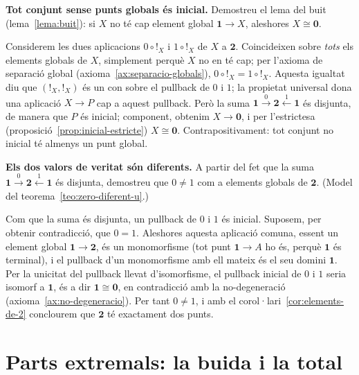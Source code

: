 \begin{exercici}
\textbf{Tot conjunt sense punts globals és inicial.} Demostreu el lema del buit (lema~\ref{lema:buit}): si \(X\) no té cap element global \(\mathbf1\to X\), aleshores \(X\cong\mathbf0\).
\end{exercici}
\begin{solucio}
Considerem les dues aplicacions \(0\circ{!}_X\) i \(1\circ{!}_X\) de \(X\) a \(\mathbf2\). Coincideixen sobre \emph{tots} els elements globals de \(X\), simplement perquè \(X\) no en té cap; per l'axioma de separació global (axioma~\ref{ax:separacio-globals}), \(0\circ{!}_X=1\circ{!}_X\). Aquesta igualtat diu que \(({!}_X,{!}_X)\) és un con sobre el pullback de \(0\) i \(1\); la propietat universal dona una aplicació \(X\to P\) cap a aquest pullback. Però la suma \(\mathbf1\xrightarrow{0}\mathbf2\xleftarrow{1}\mathbf1\) és disjunta, de manera que \(P\) és inicial; component, obtenim \(X\to\mathbf0\), i per l'estrictesa (proposició~\ref{prop:inicial-estricte}) \(X\cong\mathbf0\). Contrapositivament: tot conjunt no inicial té almenys un punt global.
\end{solucio}

\begin{exercici}
\textbf{Els dos valors de veritat són diferents.} A partir del fet que la suma \(\mathbf1\xrightarrow{0}\mathbf2\xleftarrow{1}\mathbf1\) és disjunta, demostreu que \(0\neq1\) com a elements globals de \(\mathbf2\). (Model del teorema~\ref{teo:zero-diferent-u}.)
\end{exercici}
\begin{solucio}
Com que la suma és disjunta, un pullback de \(0\) i \(1\) és inicial. Suposem, per obtenir contradicció, que \(0=1\). Aleshores aquesta aplicació comuna, essent un element global \(\mathbf1\to\mathbf2\), és un monomorfisme (tot punt \(\mathbf1\to A\) ho és, perquè \(\mathbf1\) és terminal), i el pullback d'un monomorfisme amb ell mateix és el seu domini \(\mathbf1\). Per la unicitat del pullback llevat d'isomorfisme, el pullback inicial de \(0\) i \(1\) seria isomorf a \(\mathbf1\), és a dir \(\mathbf1\cong\mathbf0\), en contradicció amb la no-degeneració (axioma~\ref{ax:no-degeneracio}). Per tant \(0\neq1\), i amb el corol·lari~\ref{cor:elements-de-2} conclourem que \(\mathbf2\) té exactament dos punts.
\end{solucio}

\section{Parts extremals: la buida i la total}\label{prac:extremals}

